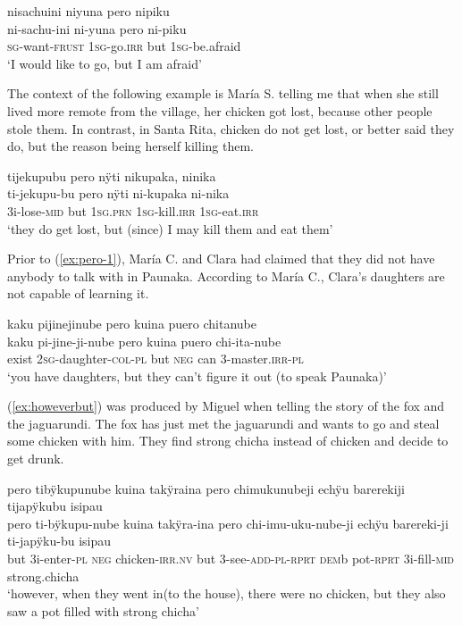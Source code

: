 \ea\label{ex:pero-2}
\begingl
\glpreamble nisachuini niyuna pero nipiku\\
\gla ni-sachu-ini ni-yuna pero ni-piku\\
\textsc{sg}-want-\textsc{frust} 1\textsc{sg}-go.\textsc{irr} but 1\textsc{sg}-be.afraid\\
\glft ‘I would like to go, but I am afraid’
\endgl
\trailingcitation{[jxx-p110923l-1.403]}
\xe

The context of the following example is María S. telling me that when she still lived more remote from the village, her chicken got lost, because other people stole them. In contrast, in Santa Rita, chicken do not get lost, or better said they do, but the reason being herself killing them.

\ea\label{ex:pero-chicken}
\begingl
\glpreamble tijekupubu pero nÿti nikupaka, ninika\\
\gla ti-jekupu-bu pero nÿti ni-kupaka ni-nika\\
\glb 3i-lose-\textsc{mid} but 1\textsc{sg.prn} 1\textsc{sg}-kill.\textsc{irr} 1\textsc{sg}-eat.\textsc{irr}\\
\glft ‘they do get lost, but (since) I may kill them and eat them’
\endgl
\trailingcitation{[rxx-e120511l.184-185]}
\xe


Prior to (\ref{ex:pero-1}), María C. and Clara had claimed that they did not have anybody to talk with in Paunaka. According to María C., Clara’s daughters are not capable of learning it.

\ea\label{ex:pero-1}
\begingl
\glpreamble kaku pijinejinube pero kuina puero chitanube \\
\gla kaku pi-jine-ji-nube pero kuina puero chi-ita-nube \\
\glb exist 2\textsc{sg}-daughter-\textsc{col}-\textsc{pl} but \textsc{neg} can 3-master.\textsc{irr}-\textsc{pl}\\
\glft ‘you have daughters, but they can’t figure it out (to speak Paunaka)’
\endgl
\trailingcitation{[cux-c120414ls-2.265]}
\xe

(\ref{ex:howeverbut}) was produced by Miguel when telling the story of the fox and the jaguarundi. The fox has just met the jaguarundi and wants to go and steal some chicken with him. They find strong chicha instead of chicken and decide to get drunk.

\ea\label{ex:howeverbut}
\begingl
\glpreamble pero tibÿkupunube kuina takÿraina pero chimukunubeji echÿu barerekiji tijapÿkubu isipau\\
\gla pero ti-bÿkupu-nube kuina takÿra-ina pero chi-imu-uku-nube-ji echÿu barereki-ji ti-japÿku-bu isipau\\
\glb but 3i-enter-\textsc{pl} \textsc{neg} chicken-\textsc{irr.nv} but 3-see-\textsc{add}-\textsc{pl}-\textsc{rprt} \textsc{dem}b pot-\textsc{rprt} 3i-fill-\textsc{mid} strong.chicha\\
\glft ‘however, when they went in(to the house), there were no chicken, but they also saw a pot filled with strong chicha’
\endgl
\trailingcitation{[jmx-n120429ls-x5.325-328]}
\xe

